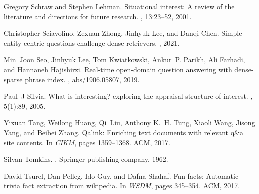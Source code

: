 \documentclass[11pt]{article}
\begin{document}
\begin{thebibliography}{10}
Gregory Schraw and Stephen Lehman.
\newblock Situational interest: A review of the literature and directions for future research.
, 13:23--52, 2001.

Christopher Sciavolino, Zexuan Zhong, Jinhyuk Lee, and Danqi Chen.
\newblock Simple entity-centric questions challenge dense retrievers.
, 2021.

Min~Joon Seo, Jinhyuk Lee, Tom Kwiatkowski, Ankur~P. Parikh, Ali Farhadi, and Hannaneh Hajishirzi.
\newblock Real-time open-domain question answering with dense-sparse phrase index.
, abs/1906.05807, 2019.

Paul~J Silvia.
\newblock What is interesting? exploring the appraisal structure of interest.
, 5(1):89, 2005.

Yixuan Tang, Weilong Huang, Qi~Liu, Anthony K.~H. Tung, Xiaoli Wang, Jisong Yang, and Beibei Zhang.
\newblock Qalink: Enriching text documents with relevant q{\&}a site contents.
\newblock In {\em {CIKM}}, pages 1359--1368. {ACM}, 2017.

Silvan Tomkins.
.
\newblock Springer publishing company, 1962.

David Tsurel, Dan Pelleg, Ido Guy, and Dafna Shahaf.
\newblock Fun facts: Automatic trivia fact extraction from wikipedia.
\newblock In {\em {WSDM}}, pages 345--354. {ACM}, 2017.

\end{thebibliography}
\end{document}
